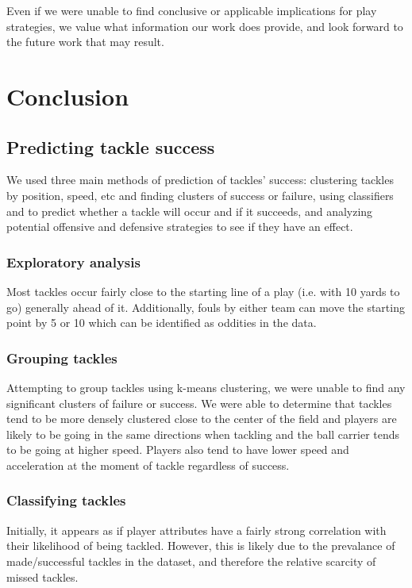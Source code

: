 \documentclass[bibtex, sigconf, hyperref={colorlinks=true,linkcolor=blue,urlcolor=blue}]{acmart}
\begin{document}
Even if we were unable to find conclusive or applicable implications for play strategies,
we value what information our work does provide, and look forward to the future work
that may result.

\section{Conclusion}

\subsection{Predicting tackle success}

We used three main methods of prediction of tackles' success:
clustering tackles by position, speed, etc and finding clusters of success or failure,
using classifiers and to predict whether a tackle will occur and if it succeeds,
and analyzing potential offensive and defensive strategies to see if they have an effect.

\subsubsection{Exploratory analysis}

Most tackles occur fairly close to the starting line of a play (i.e. with 10
yards to go) generally ahead of it. Additionally, fouls by either team can move
the starting point by 5 or 10 which can be identified as oddities in the data.

\subsubsection{Grouping tackles}

Attempting to group tackles using k-means clustering, we were unable to find
any significant clusters of failure or success. We were able to determine that
tackles tend to be more densely clustered close to the center of the field and
players are likely to be going in the same directions when tackling and the
ball carrier tends to be going at higher speed. Players also tend to have lower
speed and acceleration at the moment of tackle regardless of success.

\subsubsection{Classifying tackles}

Initially, it appears as if player attributes have a fairly strong correlation
with their likelihood of being tackled. However, this is likely due to the
prevalance of made/successful tackles in the dataset, and therefore the
relative scarcity of missed tackles.
\end{document}
